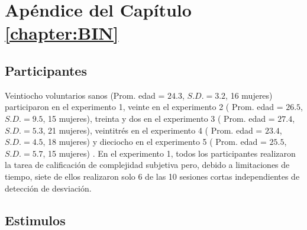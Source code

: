 \chapter{Apéndice del Capítulo \ref{chapter:BIN}}



\section{Participantes}


Veintiocho voluntarios sanos (Prom. edad = $24.3$, $S.D. = 3.2$, 16 mujeres) participaron en el experimento 1, veinte en el experimento 2 ( Prom. edad = $26.5$, $S.D. = 9.5$, 15 mujeres), treinta y dos en el experimento 3 ( Prom. edad = $27.4$, $S.D. = 5.3$, 21 mujeres), veintitrés en el experimento 4 ( Prom. edad = $23.4$, $S.D. = 4.5$, 18 mujeres) y dieciocho en el experimento 5 ( Prom. edad = $25.5$, $S.D. = 5.7$, 15 mujeres) . En el experimento 1, todos los participantes realizaron la tarea de calificación de complejidad subjetiva pero, debido a limitaciones de tiempo, siete de ellos realizaron solo 6 de las 10 sesiones cortas independientes de detección de desviación.

\section{Estimulos}

